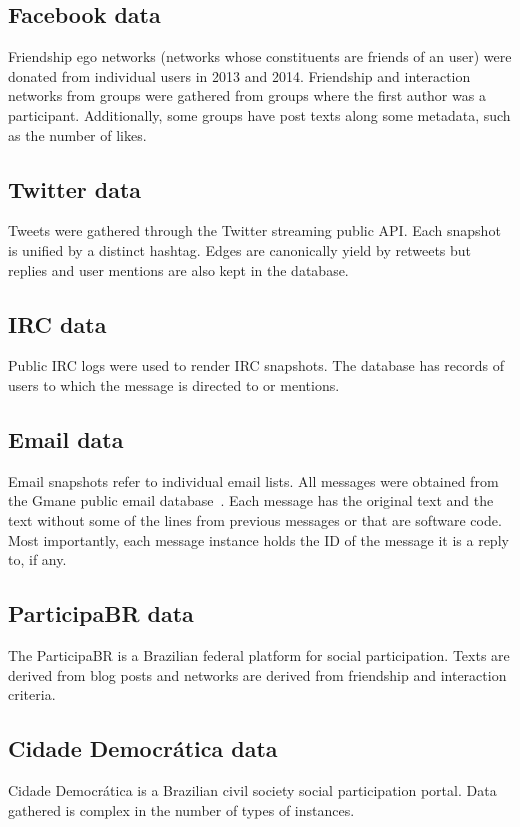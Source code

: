 \documentclass[review]{elsarticle}
\begin{document}
\subsection{Facebook data}
Friendship ego networks (networks whose constituents are friends of an user)
were donated from individual users in 2013 and 2014.
Friendship and interaction networks from groups were gathered from
groups where the first author was a participant.
Additionally, some groups have post texts along some metadata, such as
the number of likes.

\subsection{Twitter data}
Tweets were gathered through the Twitter streaming public API.
Each snapshot is unified by a distinct hashtag.
Edges are canonically yield by retweets but replies and user mentions
are also kept in the database.

\subsection{IRC data}
Public IRC logs were used to render IRC snapshots.
The database has records of users to which the message is directed to or
mentions.

\subsection{Email data}
Email snapshots refer to individual email lists.
All messages were obtained from the Gmane public email database~\cite{gmane}.
Each message has the original text and the text without some of the lines
from previous messages or that are software code.
Most importantly, each message instance holds the ID of the message it is
a reply to, if any.

\subsection{ParticipaBR data}
The ParticipaBR is a Brazilian federal platform for social participation.
Texts are derived from blog posts and networks are derived from
friendship and interaction criteria.


\subsection{Cidade Democr\'atica data}
Cidade Democr\'atica is a Brazilian civil society social participation portal.
Data gathered is complex in the number of types of instances.
\end{document}
